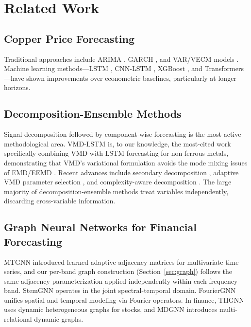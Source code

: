 \documentclass[journal]{IEEEtran}
\begin{document}
\section{Related Work}
\label{sec:related}

\subsection{Copper Price Forecasting}

Traditional approaches include ARIMA \citep{Becerra2022}, GARCH \citep{Garcia2019}, and VAR/VECM models \citep{Dai2025}. Machine learning methods---LSTM \citep{Hu2020, Luo2022}, CNN-LSTM \citep{Li2023}, XGBoost \citep{Nabavi2024}, and Transformers \citep{Tseng2025, Zhao2025}---have shown improvements over econometric baselines, particularly at longer horizons.

\subsection{Decomposition-Ensemble Methods}

Signal decomposition followed by component-wise forecasting is the most active methodological area. VMD-LSTM \citep{Liu2020} is, to our knowledge, the most-cited work specifically combining VMD with LSTM forecasting for non-ferrous metals, demonstrating that VMD's variational formulation avoids the mode mixing issues of EMD/EEMD \citep{Dragomiretskiy2014}. Recent advances include secondary decomposition \citep{LiuLiu2022, Zhang2025a}, adaptive VMD parameter selection \citep{ZhangKe2025}, and complexity-aware decomposition \citep{LiLiu2026}. The large majority of decomposition-ensemble methods treat variables independently, discarding cross-variable information.

\subsection{Graph Neural Networks for Financial Forecasting}

MTGNN \citep{Wu2020mtgnn} introduced learned adaptive adjacency matrices for multivariate time series, and our per-band graph construction (Section~\ref{sec:graph}) follows the same adjacency parameterization applied independently within each frequency band. StemGNN \citep{Cao2020} operates in the joint spectral-temporal domain. FourierGNN \citep{Yi2023} unifies spatial and temporal modeling via Fourier operators. In finance, THGNN \citep{Xiang2023} uses dynamic heterogeneous graphs for stocks, and MDGNN \citep{Qian2024} introduces multi-relational dynamic graphs.
\end{document}
